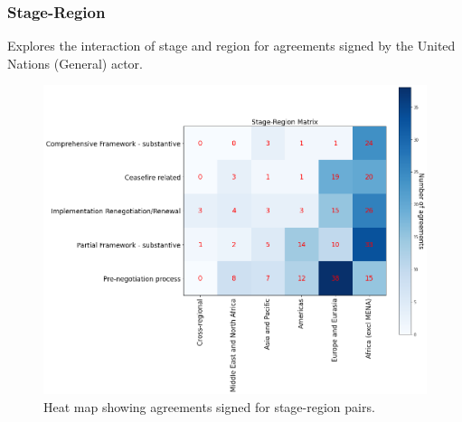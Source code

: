 \documentclass{article}
\begin{document}
\pagebreak
\subsubsection{Stage-Region}

Explores the interaction of stage and region for agreements signed by the United Nations (General) actor.

\begin{figure}[H]
\begin{center}
\includegraphics[scale=0.33]{./assets/figure_10.png}
\caption{Heat map showing agreements signed for stage-region pairs.}
\end{center}
\end{figure}
\end{document}
